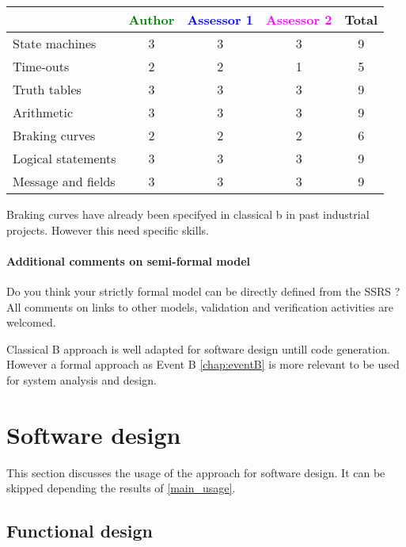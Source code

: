 \begin{tabular}{|l | c | c | c | c|}
\hline
& \textcolor{green}{Author} & \textcolor{blue}{Assessor 1} & \textcolor{magenta}{Assessor 2} & Total \\
\hline 
State machines  & 3 & 3 & 3 & 9 \\
\hline
Time-outs  & 2 & 2 & 1 & 5 \\
\hline
Truth tables  & 3 & 3 & 3 & 9 \\
\hline
Arithmetic  & 3 & 3 & 3 & 9 \\
\hline
Braking curves  & 2 & 2 & 2 & 6 \\
\hline
Logical statements & 3 & 3 & 3  & 9 \\
\hline
Message and fields & 3 & 3 & 3 & 9 \\
\hline
\end{tabular}


\begin{author_comment}
Braking curves have already been specifyed in classical b  in past industrial projects. However this need specific skills.
\end{author_comment}


\paragraph{Additional comments on semi-formal  model} Do you think your strictly formal  model can be directly defined from the SSRS ?
All comments on links to  other models, validation and verification activities are welcomed.



\begin{author_comment}
Classical B  approach is well adapted for software design untill code generation. However a formal approach as Event B \ref{chap:eventB} is more relevant to be used for system analysis and design.
\end{author_comment}


\section{Software design}
This section discusses the usage of the approach for software design.
It can be skipped depending the results of \ref{main_usage}.

\subsection{Functional design}

